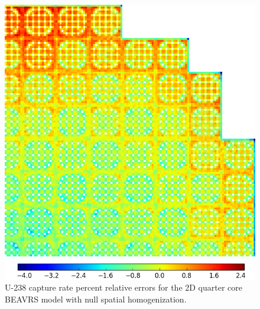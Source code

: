 \begin{figure}[h!]
\centering
\includegraphics[width=\linewidth]{figures/patterns/lns/full-core/capt-err-null}
\vspace{2mm}
\caption[U-238 capture rate errors for BEAVRS]{U-238 capture rate percent relative errors for the 2D quarter core \ac{BEAVRS} model with null spatial homogenization.}
\label{fig:chap9-full-core-capt-err-null}
\end{figure}

\clearpage

